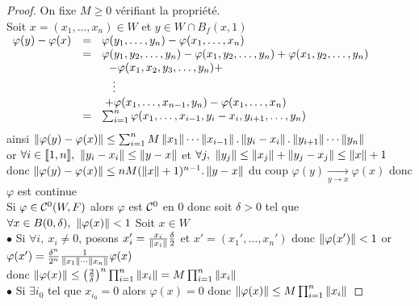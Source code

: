 		
		\begin{proof}
		\fbox{$\Leftarrow$} On fixe $M\geq 0$ vérifiant la propriété. \\
		Soit $x=(x_1 ,\dots ,x_n)\in W$ et $y\in W\cap B_f(x,1)$ \\
		$\begin{array}{ll}
			\varphi (y) - \varphi (x) & =~~\varphi (y_1 ,\dots , y_n) - \varphi (x_1 ,\dots , x_n) \\ 
			&=~~\varphi (y_1 ,y_2,\dots , y_n) - \varphi (x_1,y_2 ,\dots , y_n) + \varphi (x_1,y_2 ,\dots , y_n) \\
			&~~~~~~~ - \varphi (x_1,x_2,y_3,\dots ,y_n) + \\ 
			&~~~~~~~~\vdots \\ 
			&~~~~~~+ \varphi (x_1 ,\dots ,x_{n-1}, y_n) - \varphi (x_1 ,\dots , x_n) \\
			&=~~\sum_{i=1}^n \varphi (x_1,\dots ,x_{i-1} , y_i - x_i ,y_{i+1},\dots , y_n) \vspace*{0.2cm} 
		\end{array}$\\
		ainsi $\left\Vert \varphi (y) - \varphi (x) \right\Vert \leq \sum_{i=1}^n M \left\Vert x_1 \right\Vert\cdots\left\Vert x_{i-1} \right\Vert.\left\Vert y_i - x_i \right\Vert.\left\Vert y_{i+1} \right\Vert\cdots\left\Vert y_n \right\Vert$ \\ 
		or $\forall i\in {\llbracket 1,n \rrbracket} ,~ \left\Vert y_i-x_i \right\Vert \leq \left\Vert y-x \right\Vert$ et $\forall j ,~\left\Vert y_j \right\Vert \leq \left\Vert x_j \right\Vert + \left\Vert y_j - x_j \right\Vert \leq \left\Vert x \right\Vert + 1$ \\
		donc $\left\Vert \varphi (y) - \varphi (x) \right\Vert \leq nM(\left\Vert x \right\Vert + 1)^{n-1} .\left\Vert y-x \right\Vert$ du coup $\varphi (y) \underset{y\rightarrow x}{\longrightarrow} \varphi (x)$ donc $\varphi$ est continue\\ 
		\fbox{$\Rightarrow$} Si $\varphi \in{\mathcal{C}}^0(W,F)$ alors $\varphi$ est ${\mathcal{C}}^0$ en $0$ donc soit $\delta>0$ tel que $\forall x\in B(0,\delta ) ,~\left\Vert \varphi (x) \right\Vert <1$ Soit $x\in W$\\
		$\bullet$ Si $\forall i , ~x_i \neq 0$, posons $x_i' = \frac{x_i}{\left\Vert x_i \right\Vert}\frac{\delta}{2}$ et $x' = (x_1',\dots ,x_n')$ donc $\left\Vert \varphi (x') \right\Vert <1$ or $\varphi (x') = \frac{\delta^n}{2^n}\frac{1}{\left\Vert x_1 \right\Vert\cdots\left\Vert x_n \right\Vert} \varphi (x)$ \\
		donc $\left\Vert \varphi (x)  \right\Vert \leq \left(\frac{2}{\delta}\right)^n \prod_{i=1}^{n} \left\Vert x_i \right\Vert = M \prod_{i=1}^{n} \left\Vert x_i \right\Vert$ \\
		$\bullet$ Si $\exists i_0$ tel que $x_{i_0} =0$ alors $\varphi (x) = 0$ donc $\left\Vert \varphi (x) \right\Vert \leq M\prod_{i=1}^{n} \left\Vert x_i \right\Vert$
		\end{proof} \medskip
		
